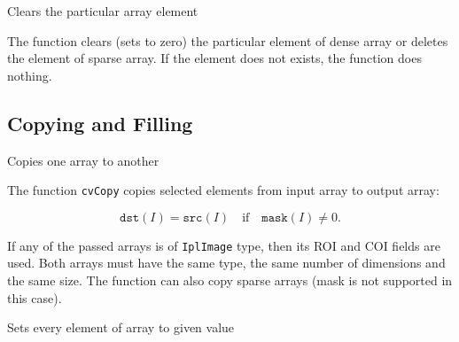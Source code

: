 \label{ClearND}

Clears the particular array element


\begin{description}
\end{description}


The function  clears (sets to zero) the particular element of dense array or deletes the element of sparse array. If the element does not exists, the function does nothing.


\subsection{Copying and Filling}


\label{Copy}

Copies one array to another


\begin{description}
\end{description}


The function \texttt{cvCopy} copies selected elements from input array to output array:

\[
\texttt{dst}(I)=\texttt{src}(I) \quad \text{if} \quad \texttt{mask}(I) \ne 0.
\]

If any of the passed arrays is of \texttt{IplImage} type, then its ROI
and COI fields are used. Both arrays must have the same type, the same
number of dimensions and the same size. The function can also copy sparse
arrays (mask is not supported in this case).

\label{Set}

Sets every element of array to given value


